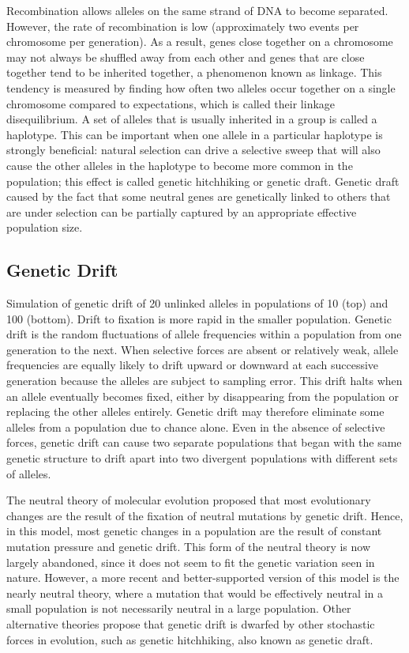 Recombination allows alleles on the same strand of DNA to become separated. However, the rate of recombination is low (approximately two events per chromosome per generation). As a result, genes close together on a chromosome may not always be shuffled away from each other and genes that are close together tend to be inherited together, a phenomenon known as linkage. This tendency is measured by finding how often two alleles occur together on a single chromosome compared to expectations, which is called their linkage disequilibrium. A set of alleles that is usually inherited in a group is called a haplotype. This can be important when one allele in a particular haplotype is strongly beneficial: natural selection can drive a selective sweep that will also cause the other alleles in the haplotype to become more common in the population; this effect is called genetic hitchhiking or genetic draft. Genetic draft caused by the fact that some neutral genes are genetically linked to others that are under selection can be partially captured by an appropriate effective population size.

\hypertarget{genetic-drift}{%
\subsection{Genetic Drift}\label{genetic-drift}}

Simulation of genetic drift of 20 unlinked alleles in populations of 10 (top) and 100 (bottom). Drift to fixation is more rapid in the smaller population.
Genetic drift is the random fluctuations of allele frequencies within a population from one generation to the next. When selective forces are absent or relatively weak, allele frequencies are equally likely to drift upward or downward at each successive generation because the alleles are subject to sampling error. This drift halts when an allele eventually becomes fixed, either by disappearing from the population or replacing the other alleles entirely. Genetic drift may therefore eliminate some alleles from a population due to chance alone. Even in the absence of selective forces, genetic drift can cause two separate populations that began with the same genetic structure to drift apart into two divergent populations with different sets of alleles.

The neutral theory of molecular evolution proposed that most evolutionary changes are the result of the fixation of neutral mutations by genetic drift. Hence, in this model, most genetic changes in a population are the result of constant mutation pressure and genetic drift. This form of the neutral theory is now largely abandoned, since it does not seem to fit the genetic variation seen in nature. However, a more recent and better-supported version of this model is the nearly neutral theory, where a mutation that would be effectively neutral in a small population is not necessarily neutral in a large population. Other alternative theories propose that genetic drift is dwarfed by other stochastic forces in evolution, such as genetic hitchhiking, also known as genetic draft.

